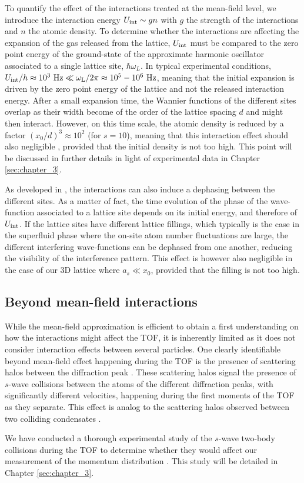 To quantify the effect of the interactions treated at the mean-field level, we introduce the interaction energy $U_{\rm{int}} \sim gn$ with $g$ the strength of the interactions and $n$ the atomic density. To determine whether the interactions are affecting the expansion of the gas released from the lattice, $U_{\rm{int}}$ must be compared to the zero point energy of the ground-state of the approximate harmonic oscillator associated to a single lattice site, $\hbar \omega_L$. In typical experimental conditions, $U_{\rm{int}}/h \approx 10^3 \ \rm{Hz} \ll \omega_L/2 \pi \approx 10^5-10^6 \ \rm{Hz}$, meaning that the initial expansion is driven by the zero point energy of the lattice and not the released interaction energy. After a small expansion time, the Wannier functions of the different sites overlap as their width become of the order of the lattice spacing $d$ and might then interact. However, on this time scale, the atomic density is reduced by a factor $(x_0/d)^3 \approx 10^2$ (for $s=10$), meaning that this interaction effect should also negligible \cite{gerbier2008expansion}, provided that the initial density is not too high. This point will be discussed in further details in light of experimental data in Chapter \ref{sec:chapter_3}.

As developed in \cite{kupferschmidt2010role}, the interactions can also induce a dephasing between the different sites. As a matter of fact, the time evolution of the phase of the wave-function associated to a lattice site depends on its initial energy, and therefore of $U_{\rm{int}}$. If the lattice sites have different lattice fillings, which typically is the case in the superfluid phase where the on-site atom number fluctuations are large, the different interfering wave-functions can be dephased from one another, reducing the visibility of the interference pattern. This effect is however also negligible \cite{gerbier2008expansion,kupferschmidt2010role} in the case of our 3D lattice where $a_s \ll x_0$, provided that the filling is not too high.

\subsection{Beyond mean-field interactions}

While the mean-field approximation is efficient to obtain a first understanding on how the interactions might affect the TOF, it is inherently limited as it does not consider interaction effects between several particles. One clearly identifiable beyond mean-field effect happening during the TOF is the presence of scattering halos between the diffraction peak \cite{greiner2001exploring}. These scattering halos signal the presence of $s$-wave collisions between the atoms of the different diffraction peaks, \ie with significantly different velocities, happening during the first moments of the TOF as they separate. This effect is analog to the scattering halos observed between two colliding condensates \cite{khakimov2016ghost,perrin2007observation,zin2006elastic}.

We have conducted a thorough experimental study of the $s$-wave two-body collisions during the TOF to determine whether they would affect our measurement of the momentum distribution \cite{tenart2020two}. This study will be detailed in Chapter \ref{sec:chapter_3}.

